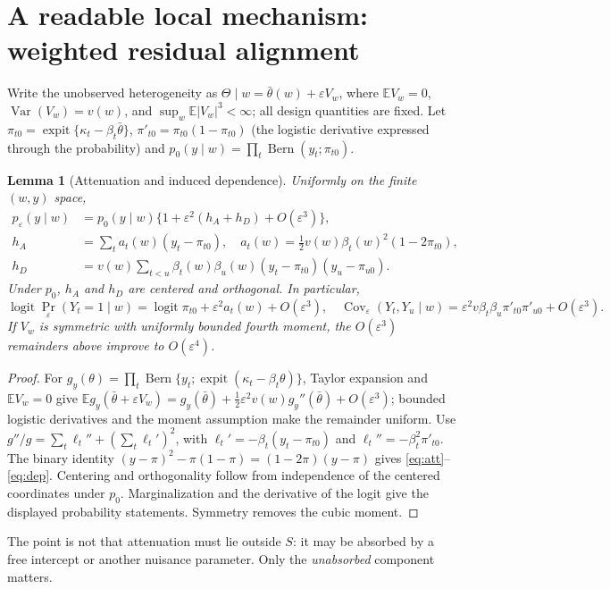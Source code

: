 \documentclass[11pt,letterpaper]{article}
\theoremstyle{plain}
\newtheorem{lemma}[theorem]{Lemma}
\theoremstyle{definition}
\newcommand{\Var}{\operatorname{Var}}
\newcommand{\Cov}{\operatorname{Cov}}
\newcommand{\Bern}{\operatorname{Bern}}
\newcommand{\logit}{\operatorname{logit}}
\newcommand{\sig}{\operatorname{expit}}
\newcommand{\E}{\mathbb E}
\begin{document}
\section{A readable local mechanism: weighted residual alignment}
Write the unobserved heterogeneity as $\Theta\mid w=\bar\theta(w)+\varepsilon V_w$, where $\E V_w=0$, $\Var(V_w)=v(w)$, and $\sup_w\E|V_w|^3<\infty$; all design quantities are fixed. Let $\pi_{t0}=\sig\{\kappa_t-\beta_t\bar\theta\}$, $\pi'_{t0}=\pi_{t0}(1-\pi_{t0})$ (the logistic derivative expressed through the probability) and $p_0(y\mid w)=\prod_t\Bern(y_t;\pi_{t0})$.
\begin{lemma}[Attenuation and induced dependence]\label{lem:expansion}
Uniformly on the finite $(w,y)$ space,
\begin{align}\label{eq:hexpand}
p_\varepsilon(y\mid w)&=p_0(y\mid w)\{1+\varepsilon^2(h_A+h_D)+O(\varepsilon^3)\},\\
h_A&=\sum_ta_t(w)(y_t-\pi_{t0}),\quad a_t(w)=\tfrac12v(w)\beta_t(w)^2(1-2\pi_{t0}),\label{eq:att}\\
h_D&=v(w)\sum_{t<u}\beta_t(w)\beta_u(w)(y_t-\pi_{t0})(y_u-\pi_{u0}).\label{eq:dep}
\end{align}
Under $p_0$, $h_A$ and $h_D$ are centered and orthogonal. In particular,
\[
\logit\Pr_\varepsilon(Y_t=1\mid w)=\logit\pi_{t0}+\varepsilon^2a_t(w)+O(\varepsilon^3),
\quad
\Cov_\varepsilon(Y_t,Y_u\mid w)=\varepsilon^2v\beta_t\beta_u\pi'_{t0}\pi'_{u0}+O(\varepsilon^3).
\]
If $V_w$ is symmetric with uniformly bounded fourth moment, the $O(\varepsilon^3)$ remainders above improve to $O(\varepsilon^4)$.
\end{lemma}
\begin{proof}
For $g_y(\theta)=\prod_t\Bern\{y_t;\sig(\kappa_t-\beta_t\theta)\}$, Taylor expansion and $\E V_w=0$ give $\E g_y(\bar\theta+\varepsilon V_w)=g_y(\bar\theta)+\frac12\varepsilon^2v(w)g_y''(\bar\theta)+O(\varepsilon^3)$; bounded logistic derivatives and the moment assumption make the remainder uniform. Use $g''/g=\sum_t\ell_t''+(\sum_t\ell_t')^2$, with $\ell_t'=-\beta_t(y_t-\pi_{t0})$ and $\ell_t''=-\beta_t^2\pi'_{t0}$. The binary identity $(y-\pi)^2-\pi(1-\pi)=(1-2\pi)(y-\pi)$ gives \eqref{eq:att}--\eqref{eq:dep}. Centering and orthogonality follow from independence of the centered coordinates under $p_0$. Marginalization and the derivative of the logit give the displayed probability statements. Symmetry removes the cubic moment.
\end{proof}

The point is not that attenuation must lie outside $S$: it may be absorbed by a free intercept or another nuisance parameter. Only the \emph{unabsorbed} component matters.
\end{document}
